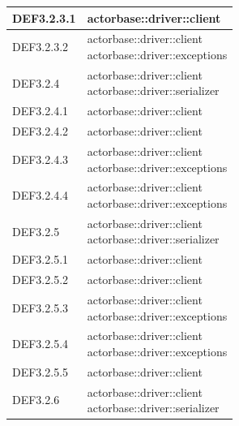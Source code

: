 \documentclass{scalatekids-article}
\begin{document}
\begin{longtable}[H]{|p{3.5cm}|p{7.5cm}|}
  \hline
  DEF3.2.3.1 & \multiLineCell[t]{actorbase::driver::client\\}\\
  \hline
  DEF3.2.3.2 & \multiLineCell[t]{actorbase::driver::client\\actorbase::driver::exceptions\\}\\
  \hline
  DEF3.2.4 & \multiLineCell[t]{actorbase::driver::client\\actorbase::driver::serializer\\}\\
  \hline
  DEF3.2.4.1 & \multiLineCell[t]{actorbase::driver::client\\}\\
  \hline
  DEF3.2.4.2 & \multiLineCell[t]{actorbase::driver::client\\}\\
  \hline
  DEF3.2.4.3 & \multiLineCell[t]{actorbase::driver::client\\actorbase::driver::exceptions\\}\\
  \hline
  DEF3.2.4.4 & \multiLineCell[t]{actorbase::driver::client\\actorbase::driver::exceptions\\}\\
  \hline
  DEF3.2.5 & \multiLineCell[t]{actorbase::driver::client\\actorbase::driver::serializer\\}\\
  \hline
  DEF3.2.5.1 & \multiLineCell[t]{actorbase::driver::client\\}\\
  \hline
  DEF3.2.5.2 & \multiLineCell[t]{actorbase::driver::client\\}\\
  \hline
  DEF3.2.5.3 & \multiLineCell[t]{actorbase::driver::client\\actorbase::driver::exceptions\\}\\
  \hline
  DEF3.2.5.4 & \multiLineCell[t]{actorbase::driver::client\\actorbase::driver::exceptions\\}\\
  \hline
  DEF3.2.5.5 & \multiLineCell[t]{actorbase::driver::client\\}\\
  \hline
  DEF3.2.6 & \multiLineCell[t]{actorbase::driver::client\\actorbase::driver::serializer\\}\\

\end{longtable}
\end{document}
